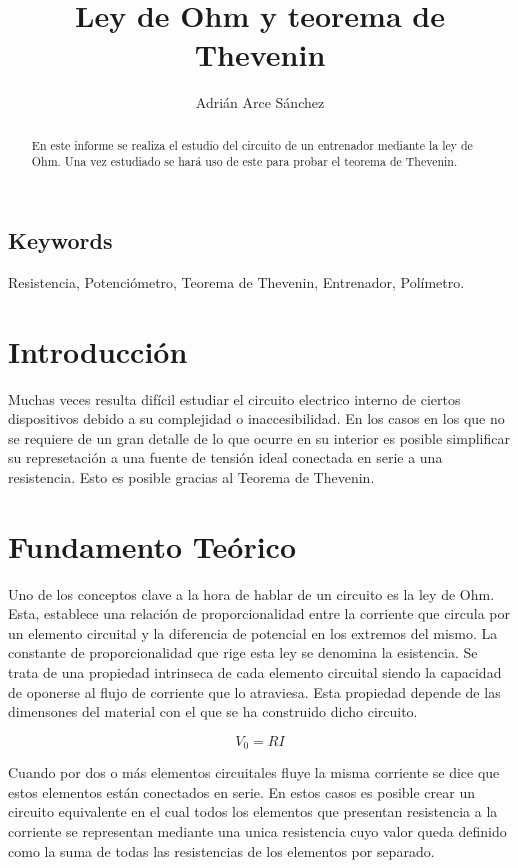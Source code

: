 \documentclass[a4paper,11pt]{article}
\begin{document}
\begin{titlepage}
\title{Ley de Ohm y teorema de Thevenin}
\author{Adrián Arce Sánchez}
\maketitle
\end{titlepage}

\begin{abstract}
En este informe se realiza el estudio del circuito de un entrenador mediante la ley de Ohm. Una vez estudiado se hará uso de este para probar el teorema de Thevenin.
\end{abstract}

\subsection*{Keywords}
Resistencia, Potenciómetro, Teorema de Thevenin, Entrenador, Polímetro.

\section{Introducción}
Muchas veces resulta difícil estudiar el circuito electrico interno de ciertos dispositivos debido a su complejidad o inaccesibilidad. En los casos en los que no se requiere de un gran detalle de lo que ocurre en su interior es posible simplificar su represetación a una fuente de tensión ideal conectada en serie a una resistencia. Esto es posible gracias al Teorema de Thevenin.

\section{Fundamento Teórico}
Uno de los conceptos clave a la hora de hablar de un circuito es la ley de Ohm. Esta, establece una relación de proporcionalidad entre la corriente que circula por un elemento circuital y la diferencia de potencial en los extremos del mismo. La constante de proporcionalidad que rige esta ley se denomina la esistencia. Se trata de una propiedad intrinseca de cada elemento circuital siendo la capacidad de oponerse al flujo de corriente que lo atraviesa. Esta propiedad depende de las dimensones del material con el que se ha construido dicho circuito.

\begin{displaymath}
V_{0}=RI
\end{displaymath}

Cuando por dos o más elementos circuitales fluye la misma corriente se dice que estos elementos están conectados en serie. En estos casos es posible crear un circuito equivalente en el cual todos los elementos que presentan resistencia a la corriente se representan mediante una unica resistencia cuyo valor queda definido como la suma de todas las resistencias de los elementos por separado.
\end{document}
